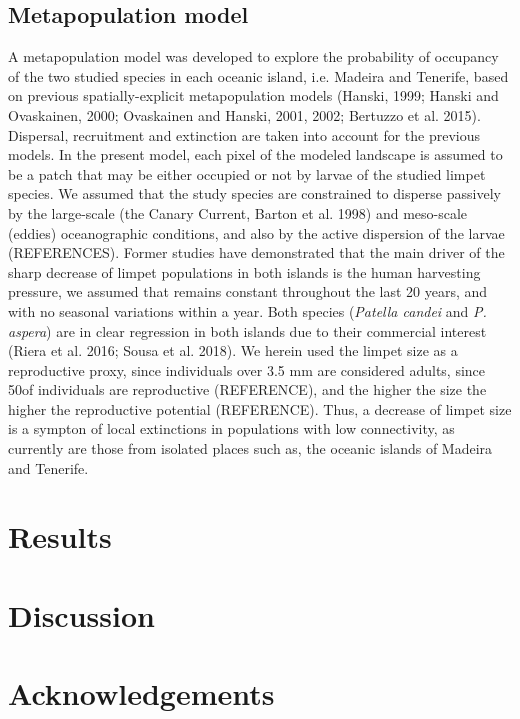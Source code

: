 \documentclass[12pt]{article}
\begin{document}
\subsection{Metapopulation model}
A metapopulation model was developed to explore the probability of occupancy of the two studied species in each oceanic island, i.e. Madeira and Tenerife, based on previous spatially-explicit metapopulation models (Hanski, 1999; Hanski and Ovaskainen, 2000; Ovaskainen and Hanski, 2001, 2002; Bertuzzo et al. 2015). Dispersal, recruitment and extinction are taken into account for the previous models. In the present model, each pixel of the modeled landscape is assumed to be a patch that may be either occupied or not by larvae of the studied limpet species. We assumed that the study species are constrained to disperse passively by the large-scale (the Canary Current, Barton et al. 1998) and meso-scale (eddies) oceanographic conditions,  and also by the active dispersion of the larvae (REFERENCES). Former studies have demonstrated that the main driver of the sharp decrease of limpet populations in both islands is the human harvesting pressure, we assumed that remains constant throughout the last 20 years, and with no seasonal variations within a year. Both species (\textit{Patella candei} and \textit{P. aspera}) are in clear regression in both islands due to their commercial interest (Riera et al. 2016; Sousa et al. 2018). We herein used the limpet size as a reproductive proxy, since individuals over 3.5 mm are considered adults, since 50\percent of individuals are reproductive (REFERENCE), and the higher the size the higher the reproductive potential (REFERENCE). Thus, a decrease of limpet size is a sympton of local extinctions in populations with low connectivity, as currently are those from isolated places such as, the oceanic islands of Madeira and Tenerife.



\section{Results}



\section{Discussion}



\section{Acknowledgements}
\end{document}
